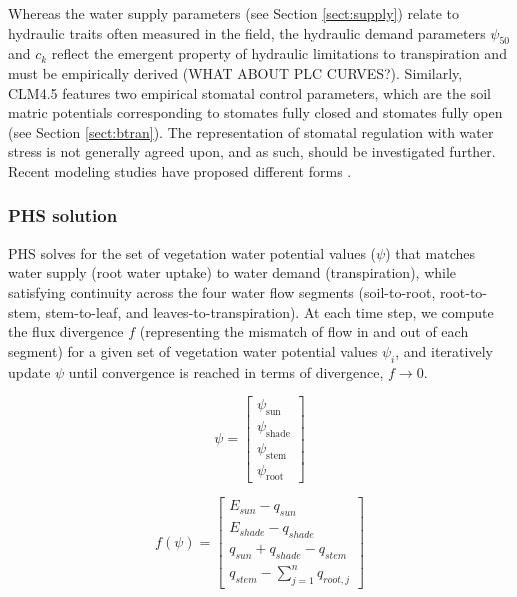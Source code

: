 \documentclass[draft,linenumbers]{agujournal}
\begin{document}
     Whereas the water supply parameters (see Section \ref{sect:supply}) relate to hydraulic traits often measured in the field, 
     the hydraulic demand parameters $\psi_{50}$ and $c_k$ reflect the emergent property of hydraulic limitations to transpiration and must be empirically derived (WHAT ABOUT PLC CURVES?). 
     Similarly, CLM4.5 features two empirical stomatal control parameters, which are the soil matric potentials 
     corresponding to stomates fully closed and stomates fully open (see Section \ref{sect:btran}).
     The representation of stomatal regulation with water stress is not generally agreed upon, and as such, should be investigated further. 
     Recent modeling studies have proposed different forms \citep{sperry2017,xu2016,christoffersen2016}. 

    \subsubsection{PHS solution}
    \label{sect:solution}
    
    PHS solves for the set of vegetation water potential values ($\psi$) that matches water supply
    (root water uptake) to water demand (transpiration), while satisfying continuity across the four water flow
    segments (soil-to-root, root-to-stem, stem-to-leaf, and leaves-to-transpiration). 
    At each time step, we compute the flux divergence $f$ (representing the mismatch of flow in and out of each segment)
    for a given set of vegetation water potential values $\psi_i$, and iteratively update $\psi$ until convergence is reached in terms of divergence, $f\to0$.
    
    \begin{linenomath*}
    \begin{equation} 
    \psi = \left[
    \begin{array}{c}
    \psi_{\text{sun}} \\ 
    \psi_{\text{shade}} \\ 
    \psi_{\text{stem}} \\ 
    \psi_{\text{root}}            
    \end{array} \right]
    \end{equation}
    \end{linenomath*}
    
    \begin{linenomath*}
    \begin{equation}
    f\left(\psi\right) = \left[ 
    \begin{array}{c}
    E_{sun}-q_{sun}\\
    E_{shade}-q_{shade}\\
    q_{sun}+q_{shade}-q_{stem}\\
    q_{stem}-\sum_{j=1}^n{q_{root,j}}
    \end{array} \right]
    \end{equation}
    \end{linenomath*}
    
\end{document}
